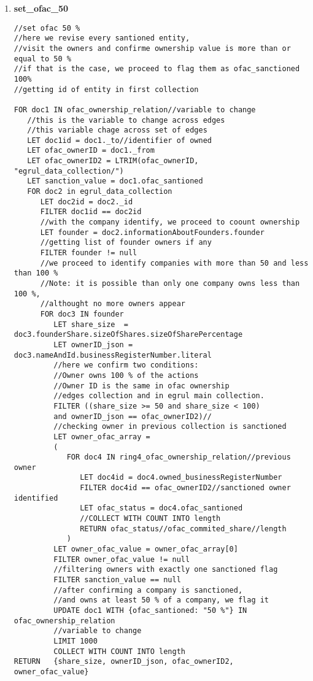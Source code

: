 \begin{enumerate}
	\item \textbf{set\_ofac\_50}\label{query9}
	\begin{verbatim}
//set ofac 50 %
//here we revise every santioned entity, 
//visit the owners and confirme ownership value is more than or equal to 50 %
//if that is the case, we proceed to flag them as ofac_sanctioned 100%
//getting id of entity in first collection

FOR doc1 IN ofac_ownership_relation//variable to change
   //this is the variable to change across edges
   //this variable chage across set of edges
   LET doc1id = doc1._to//identifier of owned
   LET ofac_ownerID = doc1._from
   LET ofac_ownerID2 = LTRIM(ofac_ownerID, "egrul_data_collection/") 
   LET sanction_value = doc1.ofac_santioned
   FOR doc2 in egrul_data_collection
      LET doc2id = doc2._id
      FILTER doc1id == doc2id
      //with the company identify, we proceed to coount ownership
      LET founder = doc2.informationAboutFounders.founder
      //getting list of founder owners if any
      FILTER founder != null
      //we proceed to identify companies with more than 50 and less than 100 %
      //Note: it is possible than only one company owns less than 100 %, 
      //althought no more owners appear
      FOR doc3 IN founder
         LET share_size  = doc3.founderShare.sizeOfShares.sizeOfSharePercentage
         LET ownerID_json = doc3.nameAndId.businessRegisterNumber.literal
         //here we confirm two conditions:
         //Owner owns 100 % of the actions
         //Owner ID is the same in ofac ownership 
         //edges collection and in egrul main collection. 
         FILTER ((share_size >= 50 and share_size < 100) 
         and ownerID_json == ofac_ownerID2)//
         //checking owner in previous collection is sanctioned
         LET owner_ofac_array = 
         (
            FOR doc4 IN ring4_ofac_ownership_relation//previous owner
               LET doc4id = doc4.owned_businessRegisterNumber
               FILTER doc4id == ofac_ownerID2//sanctioned owner identified
               LET ofac_status = doc4.ofac_santioned
               //COLLECT WITH COUNT INTO length
               RETURN ofac_status//ofac_commited_share//length
            )
         LET owner_ofac_value = owner_ofac_array[0]
         FILTER owner_ofac_value != null
         //filtering owners with exactly one sanctioned flag
         FILTER sanction_value == null
         //after confirming a company is sanctioned, 
         //and owns at least 50 % of a company, we flag it
         UPDATE doc1 WITH {ofac_santioned: "50 %"} IN ofac_ownership_relation
         //variable to change
         LIMIT 1000
         COLLECT WITH COUNT INTO length
RETURN   {share_size, ownerID_json, ofac_ownerID2,   owner_ofac_value} 
	\end{verbatim}
	

\end{enumerate}
